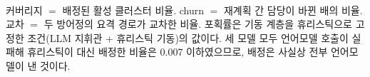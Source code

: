 \begin{table}[t]
\centering
\caption{지휘관 계획 품질과 성능. 계획 품질은 시뮬레이션 결과와 독립적으로, 계획이 산출된 시점에 측정한다. \textbf{7B 는 커버리지가 가장 높은데 포획률은 가장 낮다}. 실패 원인은 미배정이 아니다.}
\label{tab:planquality}
\footnotesize
\setlength{\tabcolsep}{4pt}%
\\[3pt]
\begin{minipage}{\linewidth}\footnotesize
커버리지 $=$ 배정된 활성 클러스터 비율. churn $=$ 재계획 간 담당이 바뀐 배의 비율. 교차 $=$ 두 방어정의 요격 경로가 교차한 비율. 포획률은 기동 계층을 휴리스틱으로 고정한 조건(LLM 지휘관 + 휴리스틱 기동)의 값이다. 세 모델 모두 언어모델 호출이 실패해 휴리스틱이 대신 배정한 비율은 0.007 이하였으므로, 배정은 사실상 전부 언어모델이 낸 것이다.
\end{minipage}
\end{table}
